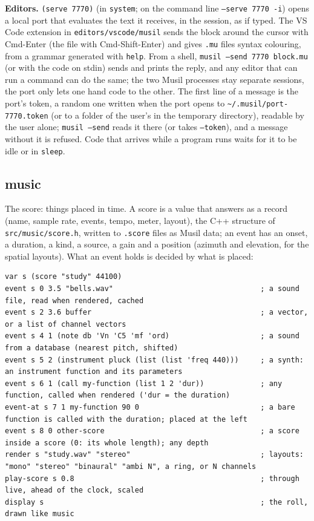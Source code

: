 \documentclass[11pt,a4paper]{article}
\newcommand{\musil}[1]{\lstinline[style=musilinline]{#1}}
\begin{document}
\textbf{Editors.} \musil{(serve 7770)} (in \texttt{system}; on the command line
\texttt{--serve 7770 -i}) opens a local port that evaluates the text it receives, in
the session, as if typed. The VS Code extension in \texttt{editors/vscode/musil} sends the
block around the cursor with Cmd-Enter (the file with Cmd-Shift-Enter) and gives
\texttt{.mu} files syntax colouring, from a grammar generated with \texttt{help}. From a
shell, \texttt{musil --send 7770 block.mu} (or with the code on stdin) sends and prints the
reply, and any editor that can run a command can do the same; the two Musil processes
stay separate sessions, the port only lets one hand code to the other. The first line of a
message is the port's token, a random one written when the port opens to
\texttt{\textasciitilde/.musil/port-7770.token} (or to a folder of the user's in the temporary
directory), readable by the user alone; \texttt{musil --send} reads it there (or takes
\texttt{--token}), and a message without it is refused. Code that arrives while a program runs
waits for it to be idle or in \musil{sleep}.



\subsection{music}

The score: things placed in time. A score is a value that answers as a record (name, sample rate,
events, tempo, meter, layout), the C++ structure of \texttt{src/music/score.h}, written to
\texttt{.score} files as Musil data; an event has an onset, a duration, a kind, a source, a gain and a position (azimuth and
elevation, for the spatial layouts). What an event holds is decided by what is placed:

\begin{lstlisting}
var s (score "study" 44100)
event s 0 3.5 "bells.wav"                                  ; a sound file, read when rendered, cached
event s 2 3.6 buffer                                       ; a vector, or a list of channel vectors
event s 4 1 (note db 'Vn 'C5 'mf 'ord)                     ; a sound from a database (nearest pitch, shifted)
event s 5 2 (instrument pluck (list (list 'freq 440)))     ; a synth: an instrument function and its parameters
event s 6 1 (call my-function (list 1 2 'dur))             ; any function, called when rendered ('dur = the duration)
event-at s 7 1 my-function 90 0                            ; a bare function is called with the duration; placed at the left
event s 8 0 other-score                                    ; a score inside a score (0: its whole length); any depth
render s "study.wav" "stereo"                              ; layouts: "mono" "stereo" "binaural" "ambi N", a ring, or N channels
play-score s 0.8                                           ; through live, ahead of the clock, scaled
display s                                                  ; the roll, drawn like music
\end{lstlisting}
\end{document}

